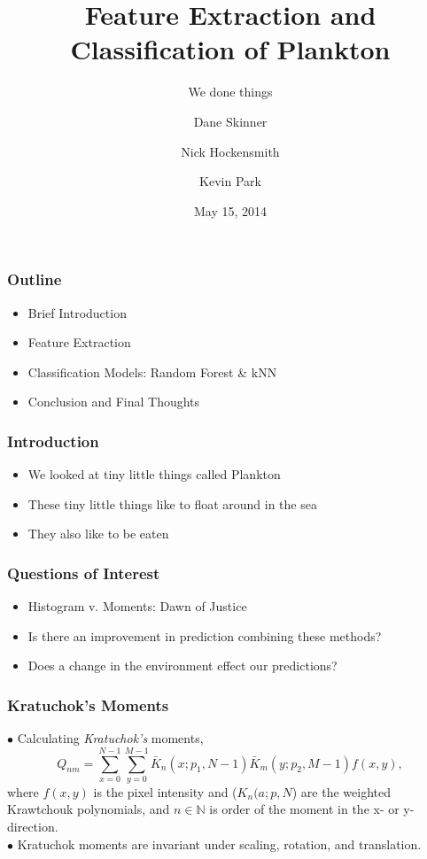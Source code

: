 \documentclass{beamer}
\title 
{Feature Extraction and Classification of Plankton}
\subtitle
{ We done things }
\author{Dane Skinner \and Nick Hockensmith \and Kevin Park}
\institute
{Oregon State University}
\date
{May 15, 2014}
\begin{document}
\begin{frame}
\frametitle{Outline}
	\begin{itemize}
	\item Brief Introduction
	\item Feature Extraction
	\item Classification Models: Random Forest \& kNN 
	\item Conclusion and Final Thoughts
	\end{itemize}
\end{frame}
\begin{frame}
\frametitle{Introduction}
\begin{itemize}
\item We looked at tiny little things called Plankton
\item These tiny little things like to float around in the sea 
\item They also like to be eaten 
\end{itemize}

\end{frame}

\begin{frame}
\frametitle{Questions of Interest}
\begin{itemize}
	\item Histogram v. Moments: Dawn of Justice
	\item Is there an improvement in prediction combining these methods?
	\item Does a change in the environment effect our predictions?
\end{itemize}

\end{frame}


\begin{frame}
\frametitle{Kratuchok's Moments}
$\bullet$ Calculating \textit{Kratuchok's} moments,
\begin{equation*}
Q_{nm} = \sum_{x=0}^{N-1}\sum_{y=0}^{M-1}\bar{K}_n(x;p_1,N-1)\bar{K}_m(y;p_2,M-1)f(x,y),
\end{equation*}
where  $f(x,y)$ is the pixel intensity and ($K_n(a;p,N$) are the weighted Krawtchouk polynomials, and $n\in \mathbb{N}$ is order of the moment in the x- or y-direction.\\
$\bullet$ Kratuchok moments are invariant under scaling, rotation, and translation. \\
\end{frame}
\end{document}
